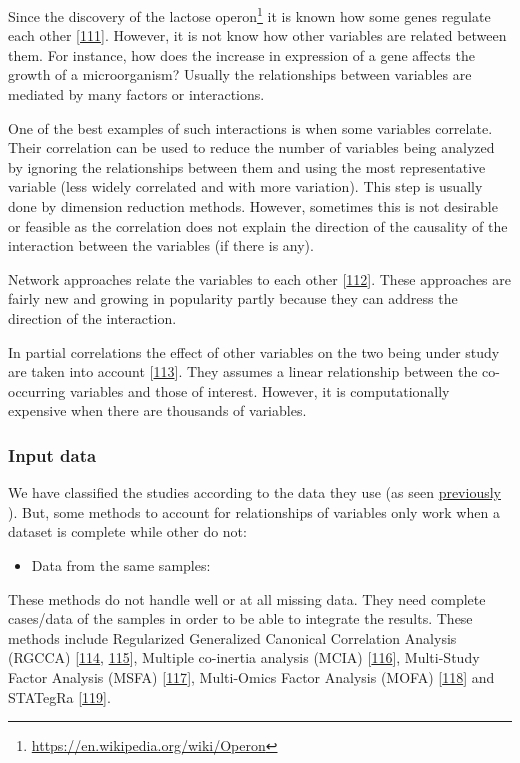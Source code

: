 \documentclass[
  a4paper,
]{book}
\DeclareRobustCommand{\href}[2]{#2\footnote{\url{#1}}}
\providecommand{\tightlist}{%
  \setlength{\itemsep}{0pt}\setlength{\parskip}{0pt}}
\begin{document}
Since the discovery of the lactose \href{https://en.wikipedia.org/wiki/Operon}{operon} it is known how some genes regulate each other {[}\protect\hyperlink{ref-jacob1961}{111}{]}.
However, it is not know how other variables are related between them.
For instance, how does the increase in expression of a gene affects the growth of a microorganism?
Usually the relationships between variables are mediated by many factors or interactions.

One of the best examples of such interactions is when some variables correlate.
Their correlation can be used to reduce the number of variables being analyzed by ignoring the relationships between them and using the most representative variable (less widely correlated and with more variation).
This step is usually done by dimension reduction methods.
However, sometimes this is not desirable or feasible as the correlation does not explain the direction of the causality of the interaction between the variables (if there is any).

Network approaches relate the variables to each other {[}\protect\hyperlink{ref-koh_iomicspass_2019}{112}{]}.
These approaches are fairly new and growing in popularity partly because they can address the direction of the interaction.

In partial correlations the effect of other variables on the two being under study are taken into account {[}\protect\hyperlink{ref-yule1907}{113}{]}.
They assumes a linear relationship between the co-occurring variables and those of interest.
However, it is computationally expensive when there are thousands of variables.

\hypertarget{input-data}{%
\subsubsection{Input data}\label{input-data}}

We have classified the studies according to the data they use (as seen \protect\hyperlink{data-origin}{previously} ).
But, some methods to account for relationships of variables only work when a dataset is complete while other do not:

\begin{itemize}
\tightlist
\item
  Data from the same samples:
\end{itemize}

These methods do not handle well or at all missing data.
They need complete cases/data of the samples in order to be able to integrate the results.
These methods include Regularized Generalized Canonical Correlation Analysis (RGCCA) {[}\protect\hyperlink{ref-tenenhaus_regularized_2011}{114}, \protect\hyperlink{ref-tenenhaus_variable_2014}{115}{]}, Multiple co-inertia analysis (MCIA) {[}\protect\hyperlink{ref-culhane_cross-platform_2003}{116}{]}, Multi-Study Factor Analysis (MSFA) {[}\protect\hyperlink{ref-vito_multi-study_2019}{117}{]}, Multi-Omics Factor Analysis (MOFA) {[}\protect\hyperlink{ref-argelaguet_multi-omics_2018}{118}{]} and STATegRa {[}\protect\hyperlink{ref-gomez-cabreroSTATegraComprehensiveMultiomics2019}{119}{]}.
\end{document}
